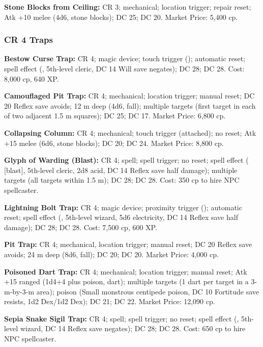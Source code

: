 \textbf{Stone Blocks from Ceiling:} CR 3; mechanical; location trigger; repair reset; Atk +10 melee (4d6, stone blocks);  DC 25;  DC 20. Market Price: 5,400 cp.

\subsubsection{CR 4 Traps}
\textbf{Bestow Curse Trap:} CR 4; magic device; touch trigger (); automatic reset; spell effect (, 5th-level cleric, DC 14 Will save negates);  DC 28;  DC 28. Cost: 8,000 cp, 640 XP.

\textbf{Camouflaged Pit Trap:} CR 4; mechanical; location trigger; manual reset; DC 20 Reflex save avoids; 12 m deep (4d6, fall); multiple targets (first target in each of two adjacent 1.5 m squares);  DC 25;  DC 17. Market Price: 6,800 cp.

\textbf{Collapsing Column:} CR 4; mechanical; touch trigger (attached); no reset; Atk +15 melee (6d6, stone blocks);  DC 20;  DC 24. Market Price: 8,800 cp.

\textbf{Glyph of Warding (Blast):} CR 4; spell; spell trigger; no reset; spell effect ( [blast], 5th-level cleric, 2d8 acid, DC 14 Reflex save half damage); multiple targets (all targets within 1.5 m);  DC 28;  DC 28. Cost: 350 cp to hire NPC spellcaster.

\textbf{Lightning Bolt Trap:} CR 4; magic device; proximity trigger (); automatic reset; spell effect (, 5th-level wizard, 5d6 electricity, DC 14 Reflex save half damage);  DC 28;  DC 28. Cost: 7,500 cp, 600 XP.

\textbf{Pit Trap:} CR 4; mechanical, location trigger; manual reset; DC 20 Reflex save avoids; 24 m deep (8d6, fall);  DC 20;  DC 20. Market Price: 4,000 cp.

\textbf{Poisoned Dart Trap:} CR 4; mechanical; location trigger; manual reset; Atk +15 ranged (1d4+4 plus poison, dart); multiple targets (1 dart per target in a 3-m-by-3-m area); poison (Small monstrous centipede poison, DC 10 Fortitude save resists, 1d2 Dex/1d2 Dex);  DC 21;  DC 22. Market Price: 12,090 cp.

\textbf{Sepia Snake Sigil Trap:} CR 4; spell; spell trigger; no reset; spell effect (, 5th-level wizard, DC 14 Reflex save negates);  DC 28;  DC 28. Cost: 650 cp to hire NPC spellcaster.

